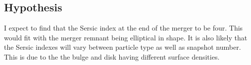 \documentclass[linenumbers,trackchanges]{aastex7}
\begin{document}
\subsection{Hypothesis}

I expect to find that the Sersic index at the end of the merger to be four.
This would fit with the merger remnant being elliptical in shape. It is also
likely that the Sersic indexes will vary between particle type as well as
snapshot number. This is due to the the bulge and disk having different
surface densities. 


{}



\end{document}
